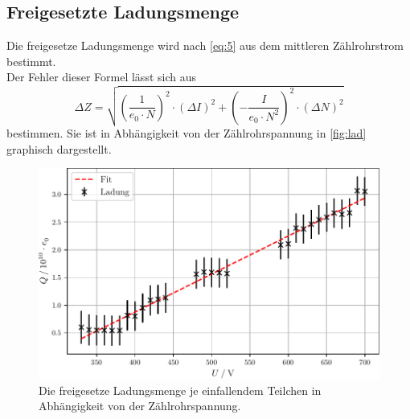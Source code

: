 \subsection{Freigesetzte Ladungsmenge}

Die freigesetze Ladungsmenge wird nach \autoref{eq:5} aus dem mittleren Zählrohrstrom
bestimmt.\\
Der Fehler dieser Formel lässt sich aus %
\begin{equation*}
  \Delta Z = \sqrt{ ( \frac{1}{e_0 \cdot N} )^2 \cdot (\Delta I)^2 + (- \frac{I}{e_0 \cdot N^2})^2 \cdot (\Delta N)^2}
\end{equation*}
bestimmen.
Sie ist in Abhängigkeit von der Zählrohrspannung in \autoref{fig:lad} graphisch dargestellt.\\
\begin{figure}[H]
  \centering
  \includegraphics[width=12cm]{content/ladung.pdf}
  \caption{Die freigesetze Ladungsmenge je einfallendem Teilchen in Abhängigkeit von der Zählrohrspannung.}
  \label{fig:lad}
\end{figure}

